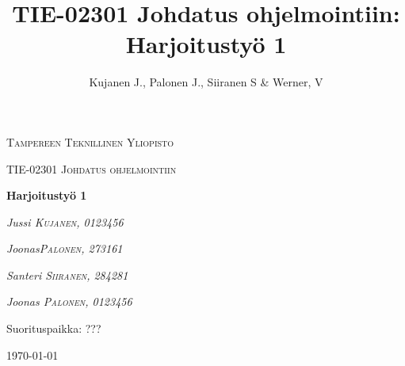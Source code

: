 \documentclass[12pt]{report} %
\title{TIE-02301 Johdatus ohjelmointiin: Harjoitustyö 1}
\author{Kujanen J., Palonen J., Siiranen S \& Werner, V}
\begin{document}

    \begin{titlepage}
        \centering
        {\scshape\LARGE Tampereen Teknillinen Yliopisto \par}
        \vspace{1cm}
        {\scshape\Large TIE-02301 Johdatus ohjelmointiin\par}
        \vspace{2.5cm}
        {\huge\bfseries Harjoitustyö 1 \par}
        \vspace{4cm}
        {\Large\itshape Jussi \textsc{Kujanen}, \textit{0123456}\par}
        {\Large\itshape Joonas\textsc{Palonen}, \textit{273161}\par}
        {\Large\itshape Santeri \textsc{Siiranen}, \textit{284281}\par}
        {\Large\itshape Joonas \textsc{Palonen}, \textit{0123456}\par}
        
        \vfill
        Suorituspaikka: \textsc{???}
    
        \vfill
    
        {\large \today \par}
    \end{titlepage}

    
    \setcounter{page}{1}                    %
    


    {
        \hypersetup{linkcolor=black}
        \tableofcontents  %
    
    }
    


    
    
\end{document}
